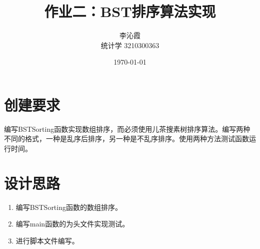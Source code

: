 \documentclass[a4paper]{article}
\title{作业二：BST排序算法实现}
\author{李沁霞\\ 统计学 3210300363}
\date{\today}
\begin{document}
\maketitle

\section{创建要求}
编写BSTSorting函数实现数组排序，而必须使用儿茶搜素树排序算法。编写两种不同的格式，一种是乱序后排序，另一种是不乱序排序。使用两种方法测试函数运行时间。

\section{设计思路}
\begin{enumerate}
    \item 编写BSTSorting函数的数组排序。
    \item 编写main函数的为头文件实现测试。
    \item 进行脚本文件编写。
\end{enumerate}
\end{document}
